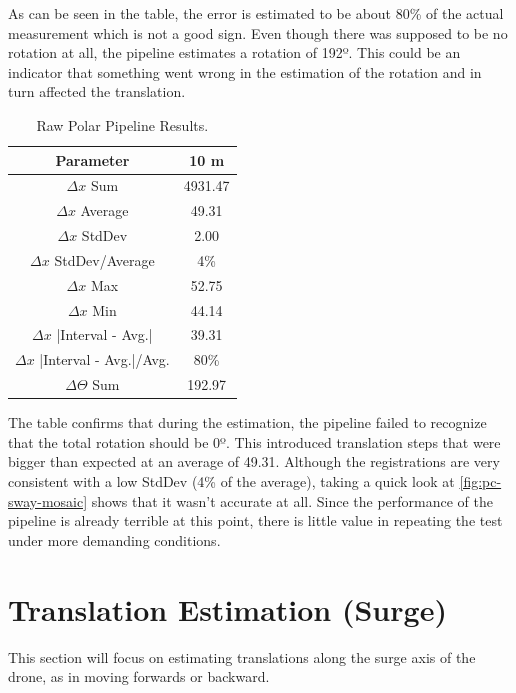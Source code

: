 As can be seen in the table, the error is estimated to be about 80\% of the actual measurement which is not a good sign. Even though there was supposed to be no rotation at all, the pipeline estimates a rotation of 192º. This could be an indicator that something went wrong in the estimation of the rotation and in turn affected the translation.

\begin{table}[H]
    \centering
    \begin{tabular}{|c|c|}
        \hline
        \textbf{Parameter} & \textbf{10 m} \\ \hline
        \(\Delta x\) Sum & 4931.47 \\ \hline
        \(\Delta x\) Average & 49.31 \\ \hline
        \(\Delta x\) StdDev & 2.00 \\ \hline
        \(\Delta x\) StdDev/Average & 4\% \\ \hline
        \(\Delta x\) Max & 52.75 \\ \hline
        \(\Delta x\) Min & 44.14 \\ \hline
        \(\Delta x\) |Interval - Avg.| & 39.31 \\ \hline
        \(\Delta x\) |Interval - Avg.|/Avg. & 80\% \\ \hline
        \(\Delta\Theta\) Sum & 192.97 \\ \hline
    \end{tabular}
    \caption{Raw Polar Pipeline Results.}
\end{table}

The table confirms that during the estimation, the pipeline failed to recognize that the total rotation should be 0º. This introduced translation steps that were bigger than expected at an average of 49.31. Although the registrations are very consistent with a low StdDev (4\% of the average), taking a quick look at \autoref{fig:pc-sway-mosaic} shows that it wasn't accurate at all. Since the performance of the pipeline is already terrible at this point, there is little value in repeating the test under more demanding conditions.


\section{Translation Estimation (Surge)}

This section will focus on estimating translations along the surge axis of the drone, as in moving forwards or backward. 

